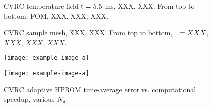 \begin{figure}
	\begin{minipage}{0.99\linewidth}
	\end{minipage}
    \begin{minipage}{0.99\linewidth}
	\end{minipage}
    \caption{CVRC temperature field $\text{t} = 5.5$ ms, XXX, XXX. From top to bottom: FOM, XXX, XXX, XXX.}
\end{figure}

\begin{figure}
	\begin{minipage}{0.99\linewidth}
	\end{minipage}
    \begin{minipage}{0.99\linewidth}
	\end{minipage}
    \begin{minipage}{0.99\linewidth}
	\end{minipage}
    \begin{minipage}{0.99\linewidth}
	\end{minipage}
    \caption{CVRC sample mesh, XXX, XXX. From top to bottom, $\text{t} = XXX$, $XXX$, $XXX$, $XXX$.}
\end{figure}

\begin{figure}
    \begin{minipage}{0.49\linewidth}
        \texttt{[image: example-image-a]}
    \end{minipage}
    \begin{minipage}{0.49\linewidth}
        \texttt{[image: example-image-a]}
    \end{minipage}
    \caption{CVRC adaptive HPROM time-average error vs. computational speedup, various $N_s$.}
\end{figure}